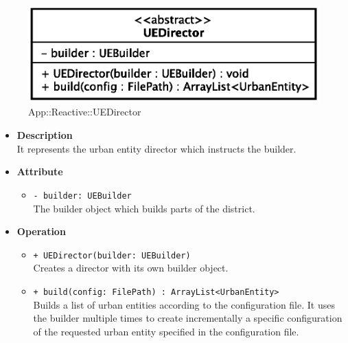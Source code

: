 \begin{figure}[h]
\centering
\includegraphics[scale=0.6,keepaspectratio]{images/solution/uedirector.eps}
\caption{App::Reactive::UEDirector}
\label{fig:sd-app-uedirector}
\end{figure}
\FloatBarrier
\begin{itemize}
  \item \textbf{Description} \\
    It represents the urban entity director which instructs the builder.
  \item \textbf{Attribute}
  \begin{itemize}
    \item \texttt{- builder: UEBuilder} \\
The builder object which builds parts of the district.
  \end{itemize}
  \item \textbf{Operation}
  \begin{itemize} 
    \item \texttt{+ UEDirector(builder: UEBuilder)} \\
Creates a director with its own builder object.
    \item \texttt{+ build(config: FilePath) : ArrayList<UrbanEntity>} \\
Builds a list of urban entities according to the configuration file. It uses the
builder multiple times to create incrementally a specific configuration of the
requested urban entity specified in the configuration file. 
  \end{itemize}
\end{itemize}
